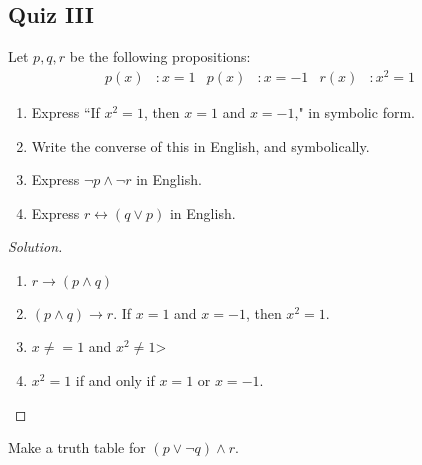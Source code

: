     \subsection{Quiz III}
    \begin{problem}
    Let $p,q,r$ be the following propositions:
    \begin{align*}
        p(x)&:x=1 & p(x)&:x=-1 & r(x)&:x^{2}=1
    \end{align*}
    \begin{enumerate}
        \item Express ``If $x^2 = 1$, then $x=1$ and $x=-1$," in symbolic form.
        \item Write the converse of this in English, and symbolically.
        \item Express $\neg p \land \neg r$ in English.
        \item Express $r\leftrightarrow (q\lor p)$ in English.
    \end{enumerate}
    \end{problem}
    \begin{proof}[Solution]
    \vspace{-\topsep}
    \
    \begin{enumerate}
        \item $r\rightarrow (p\land q)$
        \item $(p\land q) \rightarrow r$. If $x=1$ and $x=-1$, then $x^2 = 1$.
        \item $x\ne = 1$ and $x^2 \ne 1$>
        \item $x^2 = 1$ if and only if $x=1$ or $x=-1$.
    \end{enumerate}
    \end{proof}
    \begin{problem}
    \label{discrete_structures_quiz_3_problem_2}
    Make a truth table for $(p\lor \neg q)\land r$.
    \end{problem}
